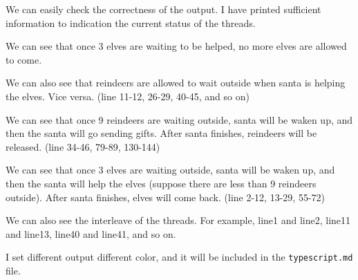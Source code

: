 We can easily check the correctness of the output. I have printed sufficient information to indication the current status of the threads. 

We can see that once 3 elves are waiting to be helped, no more elves are allowed to come. 

We can also see that reindeers are allowed to wait outside when santa is helping the elves. Vice versa. (line 11-12, 26-29, 40-45, and so on)

We can see that once 9 reindeers are waiting outside, santa will be waken up, and then the santa will go sending gifts. After santa finishes, reindeers will be released. (line 34-46, 79-89, 130-144)

We can see that once 3 elves are waiting outside, santa will be waken up, and then the santa will help the elves (suppose there are less than 9 reindeers outside). After santa finishes, elves will come back. (line 2-12, 13-29, 55-72)

We can also see the interleave of the threads. For example, line1 and line2, line11 and line13, line40 and line41, and so on.

I set different output different color, and it will be included in the \texttt{typescript.md} file.